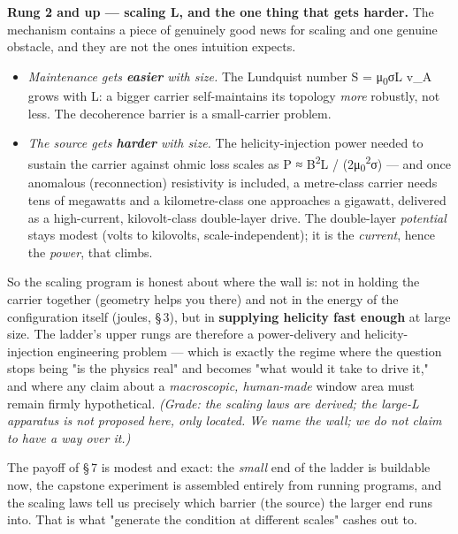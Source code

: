 \documentclass[11pt]{article}
\begin{document}
\textbf{Rung 2 and up --- scaling L, and the one thing that gets harder.} The mechanism contains a piece of genuinely good news for scaling and one genuine obstacle, and they are not the ones intuition expects.

\begin{itemize}
\item \emph{Maintenance gets \textbf{easier} with size.} The Lundquist number S = μ\textsubscript{0}σL v\_A grows with L: a bigger carrier self-maintains its topology \emph{more} robustly, not less. The decoherence barrier is a small-carrier problem.
\item \emph{The source gets \textbf{harder} with size.} The helicity-injection power needed to sustain the carrier against ohmic loss scales as P ≈ B\textsuperscript{2}L / (2μ\textsubscript{0}\textsuperscript{2}σ) --- and once anomalous (reconnection) resistivity is included, a metre-class carrier needs tens of megawatts and a kilometre-class one approaches a gigawatt, delivered as a high-current, kilovolt-class double-layer drive. The double-layer \emph{potential} stays modest (volts to kilovolts, scale-independent); it is the \emph{current}, hence the \emph{power}, that climbs.
\end{itemize}

So the scaling program is honest about where the wall is: not in holding the carrier together (geometry helps you there) and not in the energy of the configuration itself (joules, \S\,3), but in \textbf{supplying helicity fast enough} at large size. The ladder's upper rungs are therefore a power-delivery and helicity-injection engineering problem --- which is exactly the regime where the question stops being "is the physics real" and becomes "what would it take to drive it," and where any claim about a \emph{macroscopic, human-made} window area must remain firmly hypothetical. \emph{(Grade: the scaling laws are derived; the large-L apparatus is not proposed here, only located. We name the wall; we do not claim to have a way over it.)}

The payoff of \S\,7 is modest and exact: the \emph{small} end of the ladder is buildable now, the capstone experiment is assembled entirely from running programs, and the scaling laws tell us precisely which barrier (the source) the larger end runs into. That is what "generate the condition at different scales" cashes out to.
\end{document}
